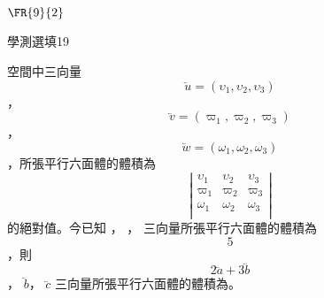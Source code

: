 \begin{QUESTIONS}
\begin{QUESTION}
        \begin{QFROMS}
        \end{QFROMS}
        \begin{QTAGS}\end{QTAGS}
        \begin{QANS}
            $\FR{9}{2}$
        \end{QANS}
        \begin{QSOLLIST}
        \end{QSOLLIST}
        \begin{QEMPTYSPACE}
        \end{QEMPTYSPACE}
    \end{QUESTION}
    \begin{QUESTION}
        \begin{ExamInfo}{85}{學測}{選填}{19}
        \end{ExamInfo}
        \begin{ExamAnsRateInfo}{}{}{}{}
        \end{ExamAnsRateInfo}
        \begin{QBODY}
            空間中三向量 \[\lvec{u}=\left( {{\upsilon }_{1}},{{\upsilon }_{2}},{{\upsilon }_{3}} \right)\]， \[\lvec{v}=\left( {{\varpi }_{1}},{{\varpi }_{2}},{{\varpi }_{3}} \right)\]， \[\lvec{w}=\left( {{\omega }_{1}},{{\omega }_{2}},{{\omega }_{3}} \right)\]，所張平行六面體的體積為\[\left| \begin{matrix}
            {{\upsilon }_{1}} & {{\upsilon }_{2}} & {{\upsilon }_{3}}  \\
            {{\varpi }_{1}} & {{\varpi }_{2}} & {{\varpi }_{3}}  \\
            {{\omega }_{1}} & {{\omega }_{2}} & {{\omega }_{3}}  \\
            \end{matrix} \right|\]的絕對值。今已知 ， ， 三向量所張平行六面體的體積為\[5\]，則\[2\lvec{a} +3 \lvec{b}\] ， $\lvec{b}$， $\lvec{c}$ 三向量所張平行六面體的體積為\TCNBOX{\TCN\TCN}。
            

\end{QBODY}
\end{QUESTION}
\end{QUESTIONS}
